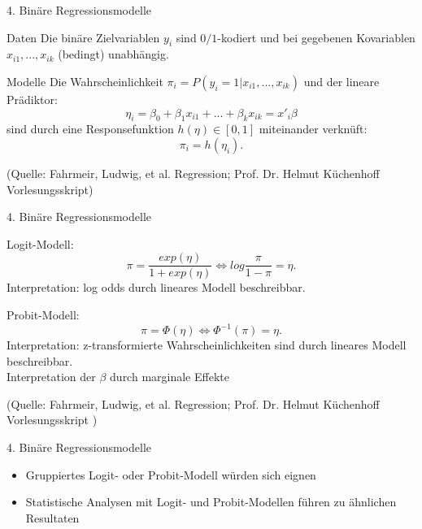 \documentclass{beamer}
\begin{document}
\begin{frame}[t]{4. Binäre Regressionsmodelle}\vspace{4pt}
\begin{block}{Daten}
Die binäre Zielvariablen $y_{i}$ sind $0/1$-kodiert und bei gegebenen Kovariablen $x_{i1},...,x_{ik}$ (bedingt) unabhängig.
\end{block}
\begin{block}{Modelle}
Die Wahrscheinlichkeit $\pi_{i}=P(y_{i}=1|x_{i1},...,x_{ik})$ und der lineare Prädiktor:
$$\eta _{i}= \beta _{0}+ \beta _{1}x_{i1}+...+ \beta  _{k}x_{ik}=x'_{i} \beta $$
sind durch eine Responsefunktion $h(\eta)\in[0,1]$ miteinander verknüft:
$$\pi_{i}=h(\eta_{i}).$$    
\end{block}
\tiny{(Quelle: Fahrmeir, Ludwig, et al. Regression; Prof. Dr. Helmut Küchenhoff Vorlesungsskript)}
\end{frame}

\begin{frame}[t]{4. Binäre Regressionsmodelle}\vspace{4pt}
\begin{block}{Logit-Modell:}
$$\pi=\frac{exp(\eta)}{1+exp(\eta)} \iff log\frac{\pi}{1-\pi}=\eta.$$
Interpretation: log odds durch lineares Modell beschreibbar.
\end{block}
\begin{block}{Probit-Modell:}
$$\pi= \Phi(\eta) \iff \Phi^{-1}(\pi)=\eta.$$
 Interpretation: z-transformierte Wahrscheinlichkeiten sind durch lineares Modell beschreibbar.\\
 Interpretation der $\beta$ durch marginale Effekte
\end{block}
\tiny{(Quelle: Fahrmeir, Ludwig, et al. Regression; Prof. Dr. Helmut Küchenhoff Vorlesungsskript )}
\end{frame}

\begin{frame}[t]{4. Binäre Regressionsmodelle}\vspace{4pt}
\begin{itemize}
\item Gruppiertes Logit- oder Probit-Modell würden sich eignen
\item Statistische Analysen mit Logit- und Probit-Modellen führen zu ähnlichen Resultaten 
\end{itemize} 

\end{frame}
\end{document}
